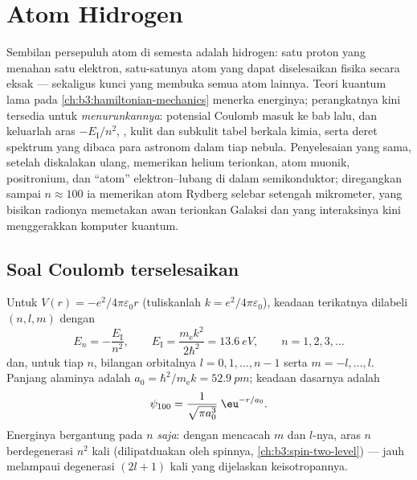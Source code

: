 \chapter{Atom Hidrogen}\label{ch:b3:hydrogen-atom}

Sembilan persepuluh atom di semesta adalah hidrogen: satu proton yang
menahan satu elektron, satu-satunya atom yang dapat diselesaikan fisika
secara eksak --- sekaligus kunci yang membuka semua atom lainnya. Teori
kuantum lama pada \cref{ch:b3:hamiltonian-mechanics} menerka energinya;
perangkatnya kini tersedia untuk \emph{menurunkannya}: potensial Coulomb
masuk ke  bab lalu, dan keluarlah aras
$-E_{\text{I}}/n^2$, , kulit dan subkulit tabel berkala
kimia, serta deret spektrum yang dibaca para astronom dalam tiap nebula.
Penyelesaian yang sama, setelah diskalakan ulang, memerikan helium
terionkan, atom muonik, positronium, dan ``atom'' elektron--lubang di
dalam semikonduktor; diregangkan sampai $n
\approx 100$ ia memerikan atom Rydberg selebar setengah mikrometer, yang
bisikan radionya memetakan awan terionkan Galaksi dan yang interaksinya
kini menggerakkan komputer kuantum.

\section{Soal Coulomb terselesaikan}

\begin{theorem}\label{thm:b3:hydrogen-atom:levels}
Untuk $V(r) = -e^2/4\pi\varepsilon_0 r$ (tuliskanlah $k = e^2/4\pi
\varepsilon_0$), keadaan terikatnya dilabeli $(n, l, m)$ dengan
\[
E_n = -\frac{E_{\text{I}}}{n^2} , \qquad
E_{\text{I}} = \frac{m_{\text{e}}k^2}{2\hbar^2} = \qty{13.6}{eV} ,
\qquad n = 1, 2, 3, \dots
\]
dan, untuk tiap $n$, bilangan orbitalnya $l = 0, 1, \dots, n-1$ serta
$m = -l, \dots, l$. Panjang alaminya adalah  $a_0 =
\hbar^2/m_{\text{e}}k = \qty{52.9}{pm}$; keadaan dasarnya adalah
\[
\psi_{100} = \frac{1}{\sqrt{\pi a_0^3}}\;\eu^{-r/a_0} .
\]
Energinya bergantung pada $n$ \emph{saja}: dengan mencacah $m$ dan
$l$-nya, aras $n$ berdegenerasi $n^2$ kali (dilipatduakan oleh spinnya,
\cref{ch:b3:spin-two-level}) --- jauh melampaui degenerasi $(2l+1)$ kali
yang dijelaskan keisotropannya.
\end{theorem}

